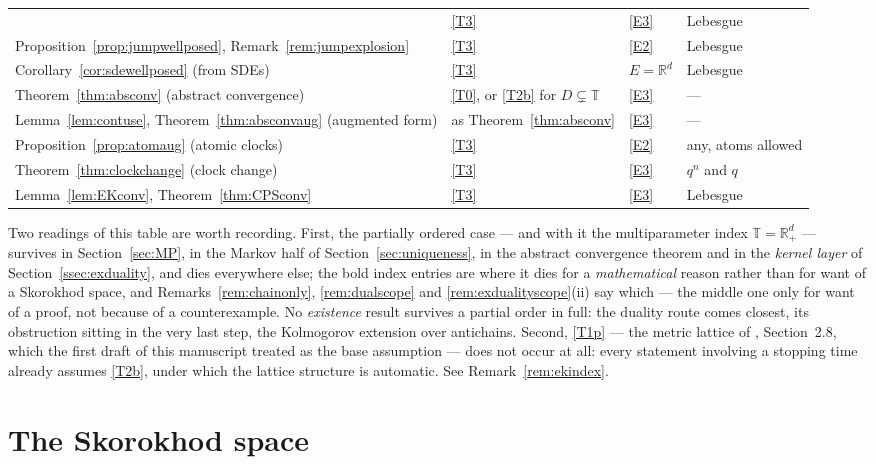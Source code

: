 \documentclass[11pt,a4paper]{article}
\theoremstyle{plain}
\theoremstyle{definition}
\theoremstyle{remark}
\newcommand{\R}{\mathbb{R}}
\newcommand{\Rp}{\R_+}
\newcommand{\T}{\mathbb{T}}                     %
\newcommand{\EK}{\cite{EK86}}
\begin{document}
\begin{tabular}{@{}p{}p{}p{}p{}@{}}
  & \eqref{T3} & \eqref{E3} & Lebesgue \\
Proposition~\ref{prop:jumpwellposed}, Remark~\ref{rem:jumpexplosion}
  & \eqref{T3} & \eqref{E2} & Lebesgue \\
Corollary~\ref{cor:sdewellposed} (from SDEs)
  & \eqref{T3} & $E = \R^d$ & Lebesgue \\
Theorem~\ref{thm:absconv} (abstract convergence)
  & \eqref{T0}, or \eqref{T2b} for $D \subsetneq \T$ & \eqref{E3} & --- \\
Lemma~\ref{lem:contuse}, Theorem~\ref{thm:absconvaug} (augmented form)
  & as Theorem~\ref{thm:absconv} & \eqref{E3} & --- \\
Proposition~\ref{prop:atomaug} (atomic clocks)
  & \eqref{T3} & \eqref{E2} & any, atoms allowed \\
Theorem~\ref{thm:clockchange} (clock change)
  & \eqref{T3} & \eqref{E3} & $q^n$ and $q$ \\
Lemma~\ref{lem:EKconv}, Theorem~\ref{thm:CPSconv}
  & \eqref{T3} & \eqref{E3} & Lebesgue \\
\bottomrule
\end{tabular}

\medskip
\noindent
Two readings of this table are worth recording.  First, the partially ordered
case --- and with it the multiparameter index $\T = \Rp^d$ --- survives in
Section~\ref{sec:MP}, in the Markov half of Section~\ref{sec:uniqueness}, in the
abstract convergence theorem and in the \emph{kernel layer} of
Section~\ref{ssec:exduality}, and dies everywhere else; the bold index entries
are where it dies for a \emph{mathematical} reason rather than for want of a
Skorokhod space, and Remarks~\ref{rem:chainonly}, \ref{rem:dualscope} and
\ref{rem:exdualityscope}(ii) say which --- the middle one only for want of a
proof, not because of a counterexample.  No \emph{existence} result survives a
partial order in full: the duality route comes closest, its obstruction sitting
in the very last step, the Kolmogorov extension over antichains.  Second, \eqref{T1p} --- the metric lattice of \EK, Section~2.8, which the
first draft of this manuscript treated as the base assumption --- does not occur
at all: every statement involving a stopping time already assumes \eqref{T2b}, under
which the lattice structure is automatic.  See Remark~\ref{rem:ekindex}.

\section{The Skorokhod space}
\label{sec:skorokhod}
\end{document}
